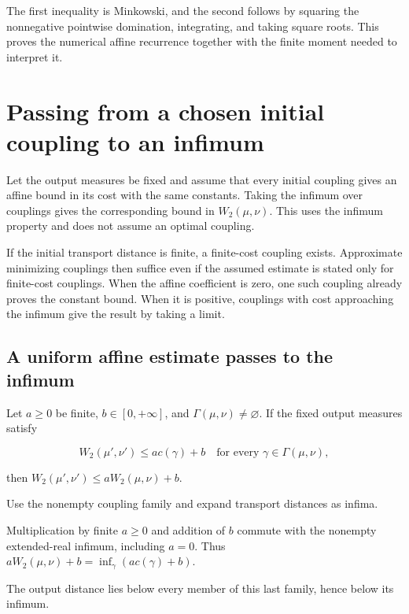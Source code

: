 \documentclass[11pt,a4paper]{article}
\begin{document}
The first inequality is Minkowski, and the second follows by squaring the nonnegative pointwise domination, integrating, and taking square roots. This proves the numerical affine recurrence together with the finite moment needed to interpret it.


\section{\texorpdfstring{Passing from a chosen initial coupling to an infimum}{Passing from a chosen initial coupling to an infimum}}


Let the output measures be fixed and assume that every initial coupling gives an affine bound in its cost with the same constants. Taking the infimum over couplings gives the corresponding bound in \(W_2(\mu,\nu)\). This uses the infimum property and does not assume an optimal coupling.



If the initial transport distance is finite, a finite-cost coupling exists. Approximate minimizing couplings then suffice even if the assumed estimate is stated only for finite-cost couplings. When the affine coefficient is zero, one such coupling already proves the constant bound. When it is positive, couplings with cost approaching the infimum give the result by taking a limit.


\subsection{\texorpdfstring{A uniform affine estimate passes to the infimum}{A uniform affine estimate passes to the infimum}}


Let \(a\ge0\) be finite, \(b\in[0,+\infty]\), and \(\Gamma(\mu,\nu)\ne\varnothing\). If the fixed output measures satisfy

\[W_2(\mu',\nu')\le ac(\gamma)+b\quad\text{for every }\gamma\in\Gamma(\mu,\nu),\]

then \(W_2(\mu',\nu')\le aW_2(\mu,\nu)+b\).



Use the nonempty coupling family and expand transport distances as infima.



Multiplication by finite \(a\ge0\) and addition of \(b\) commute with the nonempty extended-real infimum, including \(a=0\). Thus \(aW_2(\mu,\nu)+b=\inf_\gamma(ac(\gamma)+b)\).



The output distance lies below every member of this last family, hence below its infimum.
\end{document}
